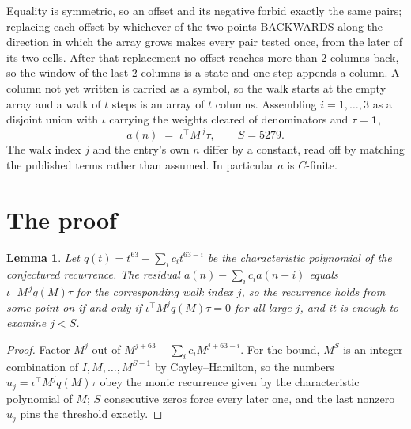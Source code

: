 \documentclass[11pt,a4paper]{article}
\theoremstyle{plain}
\newtheorem{lemma}[theorem]{Lemma}
\theoremstyle{definition}
\begin{document}
Equality is symmetric, so an offset and its negative forbid exactly the same pairs; replacing
each offset by whichever of the two points BACKWARDS along the direction in which the array
grows makes every pair tested once, from the later of its two cells. After that replacement no
offset reaches more than $2$ columns back, so the window of the last $2$
columns is a state and one step appends a column. A column not yet written is
carried as a symbol, so the walk starts at the empty array and a walk of $t$ steps is an array
of $t$ columns. Assembling $i=1,\dots,3$ as a disjoint union with $\iota$ carrying the
weights cleared of denominators and $\tau=\mathbf{1}$,
\[
a(n)\;=\;\iota^{\!\top}M^{\,j}\tau ,\qquad S=5279.
\]
The walk index $j$ and the entry's own $n$ differ by a constant, read off by matching the
published terms rather than assumed. In particular $a$ is $C$-finite.

\section{The proof}

\begin{lemma}\label{lem:crit}
Let $q(t)=t^{63}-\sum_i c_it^{63-i}$ be the characteristic polynomial of the
conjectured recurrence. The residual $a(n)-\sum_ic_ia(n-i)$ equals
$\iota^{\!\top}M^{\,j}q(M)\tau$ for the corresponding walk index $j$, so the recurrence
holds from some point on if and only if $\iota^{\!\top}M^{j}q(M)\tau=0$ for all large $j$,
and it is enough to examine $j<S$.
\end{lemma}

\begin{proof}
Factor $M^{j}$ out of $M^{j+63}-\sum_ic_iM^{j+63-i}$. For the bound, $M^{S}$
is an integer combination of $I,M,\dots,M^{S-1}$ by Cayley--Hamilton, so the numbers
$u_j=\iota^{\!\top}M^{j}q(M)\tau$ obey the monic recurrence given by the characteristic
polynomial of $M$; $S$ consecutive zeros force every later one, and the last nonzero $u_j$
pins the threshold exactly.
\end{proof}
\end{document}
